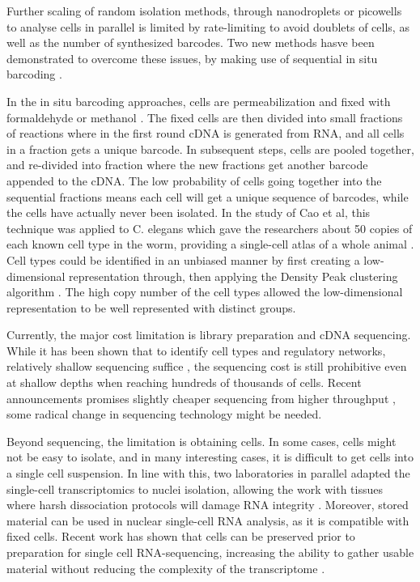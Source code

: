 Further scaling of random isolation methods, through nanodroplets or picowells to analyse
cells in parallel is limited by rate-limiting to avoid doublets of cells, as well as the number of
synthesized barcodes. Two new methods hasve been demonstrated to overcome these
issues, by making use of sequential in situ barcoding \cite{Rosenberg2017-jt, Cao2017-ux}.

In the in situ barcoding approaches, cells are permeabilization and fixed with formaldehyde \cite{Rosenberg2017-jt}
or methanol \cite{Cao2017-ux}. The fixed cells are then divided into small fractions of reactions where in the first round cDNA is generated from RNA, and all cells in a fraction gets a unique barcode. In subsequent steps, cells are pooled together, and re-divided into fraction where the new fractions get another barcode appended to the cDNA. The low probability of cells going together into the sequential fractions means each cell will get a unique sequence of
barcodes, while the cells have actually never been isolated. In the study of Cao et al, this technique was applied to C. elegans which gave the researchers about 50 copies of each known cell type in the worm, providing a single-cell atlas of a whole animal \cite{Cao2017-ux}. Cell types could be identified in an unbiased manner by first creating a low-dimensional representation through, then applying the Density Peak clustering algorithm \cite{Rodriguez2014-mc}. The high copy number of the cell types allowed the low-dimensional representation to be well represented with distinct
groups.

Currently, the major cost limitation is library preparation and cDNA sequencing. While it has been shown that to identify cell types and regulatory networks, relatively shallow sequencing suffice \cite{Heimberg2016-qw, Pollen2014-cs}, the sequencing cost is still prohibitive even at shallow depths when reaching hundreds of thousands of cells. Recent announcements promises slightly cheaper sequencing from higher throughput \cite{Illumina_Inc2017-zg}, some radical change in sequencing technology might be needed.

Beyond sequencing, the limitation is obtaining cells. In some cases, cells might not be easy to isolate, and in many interesting cases, it is difficult to get cells into a single cell suspension. In line with this, two laboratories in parallel adapted the single-cell transcriptomics to nuclei isolation, allowing the work with tissues where harsh dissociation protocols will damage RNA integrity \cite{Habib2016-jm, Habib2017-jk, Lake2016-zb}. Moreover, stored material can be used in nuclear single-cell RNA analysis, as it is compatible with fixed cells. Recent work has shown that cells can be preserved prior to preparation for single cell RNA-sequencing, increasing the ability to gather usable material without reducing the complexity of the transcriptome \cite{Guillaumet-Adkins2017-po, Alles2017-vi}.

